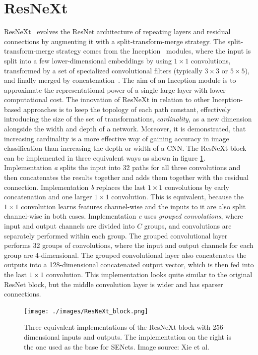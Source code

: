 \documentclass[english,twoside,openright]{HYgraduMLDS}
\begin{document}
\section{ResNeXt}
\label{section:ResNeXt}
ResNeXt~\cite{ResNeXt} evolves the ResNet architecture of repeating layers and residual connections by augmenting it with a split-transform-merge strategy. The split-transform-merge strategy comes from the Inception~\cite{InceptionV4} modules, where the input is split into a few lower-dimensional embeddings by using $1 \times 1$ convolutions, transformed by a set of specialized convolutional filters (typically $3 \times 3$ or $5 \times 5$), and finally merged by concatenation~\cite{ResNeXt}. The aim of an Inception module is to approximate the representational power of a single large layer with lower computational cost. The innovation of ResNeXt in relation to other Inception-based approaches is to keep the topology of each path constant, effectively introducing the size of the set of transformations, \textit{cardinality}, as a new dimension alongside the width and depth of a network. Moreover, it is demonstrated, that increasing cardinality is a more effective way of gaining accuracy in image classification than increasing the depth or width of a CNN. The ResNeXt block can be implemented in three equivalent ways as shown in figure \ref{fig:ResNeXt_block}. Implementation \textit{a} splits the input into 32 paths for all three convolutions and then concatenates the results together and adds them together with the residual connection. Implementation \textit{b} replaces the last $1 \times 1$ convolutions by early concatenation and one larger $1 \times 1$ convolution. This is equivalent, because the $1 \times 1$ convolution learns features channel-wise and the inputs to it are also split channel-wise in both cases. Implementation \textit{c} uses \textit{grouped convolutions}, where input and output channels are divided into
$C$ groups, and convolutions are separately performed within each group. The grouped convolutional layer performs 32 groups of convolutions, where the input and output channels for each group are 4-dimensional. The grouped convolutional layer also concatenates the outputs into a 128-dimensional concatenated output vector, which is then fed into the last $1 \times 1$ convolution. This implementation looks quite similar to the original ResNet block, but the middle convolution layer is wider and has sparser connections. 

\begin{figure}[h] 
\centering
\texttt{[image: ./images/ResNeXt\_block.png]}
\caption{Three equivalent implementations of the ResNeXt block with 256-dimensional inputs and outputs. The implementation on the right is the one used as the base for SENets. Image source: Xie et al.~\cite{ResNeXt}}
\label{fig:ResNeXt_block} 
\end{figure}
\end{document}
